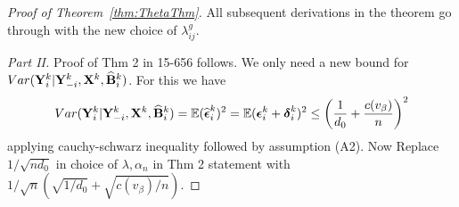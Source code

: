\documentclass[fleqn,11pt]{article}
\numberwithin{equation}{section}
\begin{document}
\begin{proof}[Proof of Theorem~\ref{thm:ThetaThm}]
All subsequent derivations in the theorem go through with the new choice of $\lambda_{ij}^g$.

%
%
%

\textit{Part II.} Proof of Thm 2 in 15-656 follows. We only need a new bound for $Var ({\mathbf{Y}}_i^k | {\mathbf{Y}}_{-i}^k, {\mathbf{X}}^k, \widehat {{\mathbf{B}}}_i^k)$. For this we have
%
$$ Var ({\mathbf{Y}}_i^k | {\mathbf{Y}}_{-i}^k, {\mathbf{X}}^k, \widehat {{\mathbf{B}}}_i^k) = {\mathbb{E}} (\widehat {{\boldsymbol{\epsilon}}}_i^k)^2
= {\mathbb{E}} ( {\boldsymbol{\epsilon}}_i^k + {\boldsymbol{\delta}}_i^k)^2
\leq \left( \frac{1}{d_0} + \frac{c(v_\beta)}{n} \right)^2
$$
%
applying cauchy-schwarz inequality followed by assumption (A2). Now Replace $1/\sqrt{n d_0}$ in choice of $\lambda, \alpha_n$ in Thm 2 statement with $1/\sqrt{n} (\sqrt{1/d_0} + \sqrt{c(v_\beta)/ n})$.

\end{proof}
\end{document}
